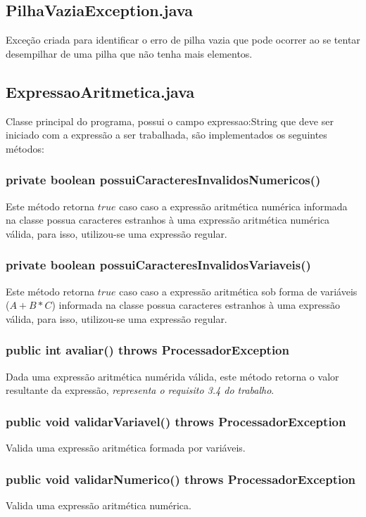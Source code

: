 \documentclass[a4paper,11pt]{article}
\begin{document}
\subsection{PilhaVaziaException.java}
Exceção criada para identificar o erro de pilha vazia que pode ocorrer ao se tentar desempilhar de uma pilha que não tenha mais elementos.

\subsection{ExpressaoAritmetica.java}
Classe principal do programa, possui o campo expressao:String que deve ser iniciado com a expressão a ser trabalhada, são implementados os seguintes métodos:

\subsubsection{private boolean possuiCaracteresInvalidosNumericos()}
Este método retorna \(true\) caso caso a expressão aritmética numérica informada na classe possua caracteres estranhos à uma expressão aritmética numérica válida, para isso, utilizou-se uma expressão regular. 

\subsubsection{private boolean possuiCaracteresInvalidosVariaveis()}
Este método retorna \(true\) caso caso a expressão aritmética sob forma de variáveis (\(A+B*C\)) informada na classe possua caracteres estranhos à uma expressão válida, para isso, utilizou-se uma expressão regular. 

\subsubsection{public int avaliar() throws ProcessadorException}
Dada uma expressão aritmética numérida válida, este método retorna o valor resultante da expressão,  \emph{representa o requisito 3.4 do trabalho}.

\subsubsection{public void validarVariavel() throws ProcessadorException}
Valida uma expressão aritmética formada por variáveis.

\subsubsection{public void validarNumerico() throws ProcessadorException}
Valida uma expressão aritmética numérica.
\end{document}
